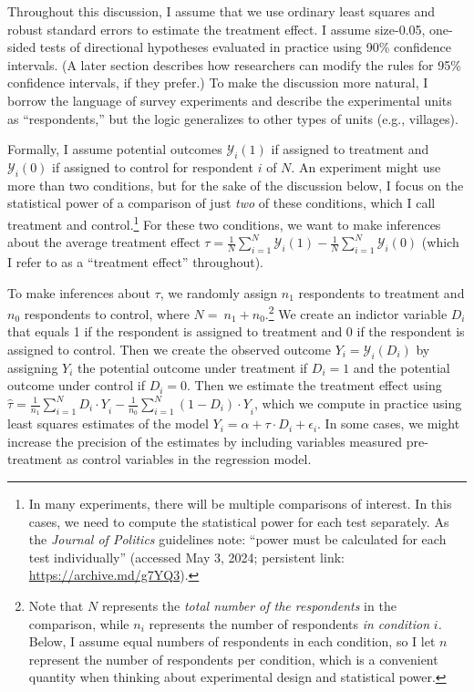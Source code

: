 \documentclass[12pt]{article}
\begin{document}
Throughout this discussion, I assume that we use ordinary least squares and robust standard errors to estimate the treatment effect. 
I assume size-0.05, one-sided tests of directional hypotheses evaluated in practice using 90\% confidence intervals. 
(A later section describes how researchers can modify the rules for 95\% confidence intervals, if they prefer.)
To make the discussion more natural, I borrow the language of survey experiments and describe the experimental units as ``respondents,'' but the logic generalizes to other types of units (e.g., villages). 

Formally, I assume potential outcomes $\mathcal{Y}_{i}(1)$ if assigned to treatment and $\mathcal{Y}_{i}(0)$ if assigned to control for respondent $i$ of $N$. 
An experiment might use more than two conditions, but for the sake of the discussion below, I focus on the statistical power of a comparison of just \emph{two} of these conditions, which I call treatment and control.\footnote{
   In many experiments, there will be multiple comparisons of interest. 
   In this cases, we need to compute the statistical power for each test separately.
   As the \textit{Journal of Politics} guidelines note: ``power must be calculated for each test individually'' (accessed May 3, 2024; persistent link: \url{https://archive.md/g7YQ3}).
  }
For these two conditions, we want to make inferences about the average treatment effect $\tau = \frac{1}{N}\sum_{i = 1}^{N}{\mathcal{Y}_{i}(1)} - \frac{1}{N}\sum_{i = 1}^{N}{\mathcal{Y}_{i}(0)}$ (which I refer to as a ``treatment effect'' throughout).

To make inferences about $\tau$, we randomly assign $n_{1}$ respondents to treatment and $n_{0}$ respondents to control, where $N = \ n_{1} + n_{0}$.\footnote{
  Note that $N$ represents the \emph{total number of the respondents} in the comparison, while $n_{i}$ represents the number of respondents \emph{in condition} $i$\emph{.}
  Below, I assume equal numbers of respondents in each condition, so I let $n$ represent the number of respondents per condition, which is a convenient quantity when thinking about experimental design and statistical power.
  }
We create an indictor variable $D_{i}$ that equals 1 if the respondent is assigned to treatment and 0 if the respondent is assigned to control. 
Then we create the observed outcome $Y_{i} = \mathcal{Y}_{i}\left( D_{i} \right)$ by assigning $Y_{i}$ the potential outcome under treatment if $D_{i} = 1$ and the potential outcome under control if $D_{i} = 0$. 
Then we estimate the treatment effect using $\widehat{\tau} = \frac{1}{n_{1}}\sum_{i = 1}^{N}{{D_{i} \cdot Y}_{i}} - \frac{1}{n_{0}}\sum_{i = 1}^{N}{{\left( 1 - D_{i} \right) \cdot Y}_{i}}$, which we compute in practice using least squares estimates of the model $Y_{i} = \alpha + \tau \cdot D_{i} + \epsilon_{i}$. 
In some cases, we might increase the precision of the estimates by including variables measured pre-treatment as control variables in the regression model.
\end{document}
